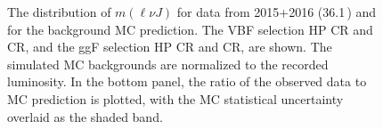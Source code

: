 \begin{figure}[htbp]
\caption[Data and Monte Carlo comparison in the high purity control regions]{The distribution of $m(\ell\nu J)$ for data from 2015+2016 (36.1\,\ifb) and for the background MC prediction. The VBF selection HP \protect{} \Wjets CR and \protect{} \ttbar CR, and the ggF selection HP \protect{} \Wjets CR and \protect{} \ttbar CR, are shown. The simulated MC backgrounds are normalized to the recorded luminosity. In the bottom panel, the ratio of the observed data to MC prediction is plotted, with the MC statistical uncertainty overlaid as the shaded band. }
\label{fig:datamc_hpcr}
\end{figure}

\begin{figure}[htbp]
\centering
{}
\\

\end{figure}
